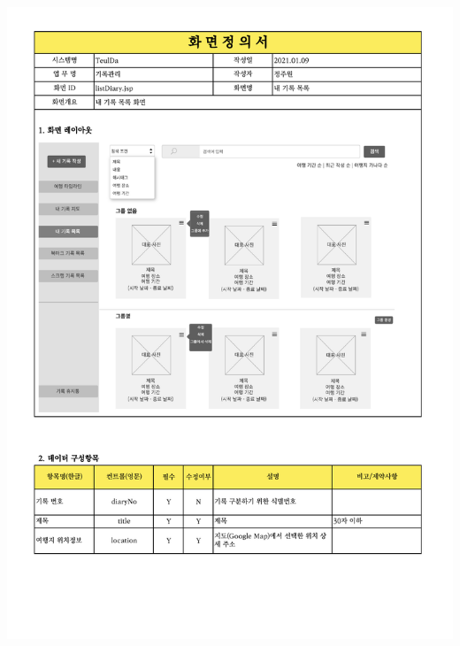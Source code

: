 {{{{{{{{{{{{{{{\includegraphics[width=20cm]{./Figure/Analysis/Display/diary/diary_14.pdf} \\
}}}}}}}}}}}}}}}
